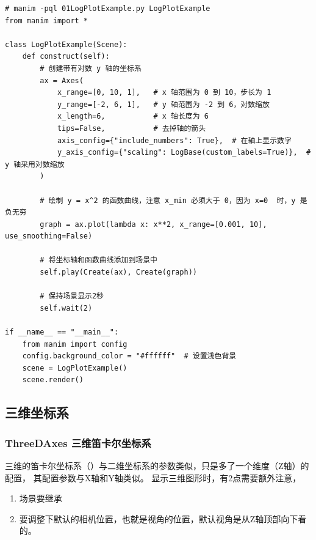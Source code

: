 \begin{lstlisting}[style=pythonstyle]
# manim -pql 01LogPlotExample.py LogPlotExample
from manim import *

class LogPlotExample(Scene):
    def construct(self):
        # 创建带有对数 y 轴的坐标系
        ax = Axes(
            x_range=[0, 10, 1],   # x 轴范围为 0 到 10，步长为 1
            y_range=[-2, 6, 1],   # y 轴范围为 -2 到 6，对数缩放
            x_length=6,           # x 轴长度为 6
            tips=False,           # 去掉轴的箭头
            axis_config={"include_numbers": True},  # 在轴上显示数字
            y_axis_config={"scaling": LogBase(custom_labels=True)},  # y 轴采用对数缩放
        )

        # 绘制 y = x^2 的函数曲线，注意 x_min 必须大于 0，因为 x=0  时，y 是负无穷
        graph = ax.plot(lambda x: x**2, x_range=[0.001, 10], use_smoothing=False)

        # 将坐标轴和函数曲线添加到场景中
        self.play(Create(ax), Create(graph))

        # 保持场景显示2秒
        self.wait(2)

if __name__ == "__main__":
    from manim import config
    config.background_color = "#ffffff"  # 设置浅色背景
    scene = LogPlotExample()
    scene.render()
\end{lstlisting}     



\subsection{三维坐标系}
\label{subsec:Manim基本图形-三维坐标系}
\subsubsection{ThreeDAxes 三维笛卡尔坐标系}
\label{subsubsec:Manim基本图形-三维笛卡尔坐标系}
三维的笛卡尔坐标系（）与二维坐标系的参数类似，只是多了一个维度（Z轴）的配置， 其配置参数与X轴和Y轴类似。 
显示三维图形时，有2点需要额外注意，
\begin{enumerate}[label=\arabic*)]
    \item 场景要继承 
    \item 要调整下默认的相机位置，也就是视角的位置，默认视角是从Z轴顶部向下看的。
\end{enumerate}

